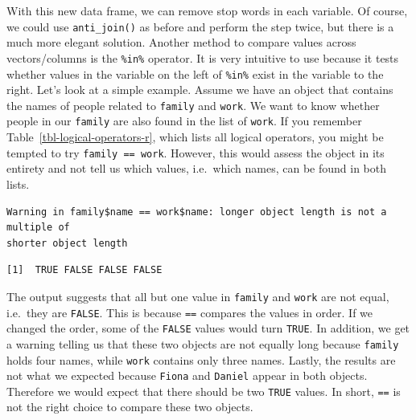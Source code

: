 \documentclass[
  letterpaper,
  DIV=11,
  numbers=noendperiod]{scrreprt}
\newenvironment{Shaded}{\begin{snugshade}}{\end{snugshade}}
\newcommand{\AttributeTok}[1]{\textcolor[rgb]{0.40,0.45,0.13}{#1}}
\newcommand{\CommentTok}[1]{\textcolor[rgb]{0.37,0.37,0.37}{#1}}
\newcommand{\FunctionTok}[1]{\textcolor[rgb]{0.28,0.35,0.67}{#1}}
\newcommand{\NormalTok}[1]{\textcolor[rgb]{0.00,0.23,0.31}{#1}}
\newcommand{\OtherTok}[1]{\textcolor[rgb]{0.00,0.23,0.31}{#1}}
\newcommand{\SpecialCharTok}[1]{\textcolor[rgb]{0.37,0.37,0.37}{#1}}
\newcommand{\StringTok}[1]{\textcolor[rgb]{0.13,0.47,0.30}{#1}}
\begin{document}
With this new data frame, we can remove stop words in each variable. Of
course, we could use \texttt{anti\_join()} as before and perform the
step twice, but there is a much more elegant solution. Another method to
compare values across vectors/columns is the \texttt{\%in\%} operator.
It is very intuitive to use because it tests whether values in the
variable on the left of \texttt{\%in\%} exist in the variable to the
right. Let's look at a simple example. Assume we have an object that
contains the names of people related to \texttt{family} and
\texttt{work}. We want to know whether people in our \texttt{family} are
also found in the list of \texttt{work}. If you remember
Table~\ref{tbl-logical-operators-r}, which lists all logical operators,
you might be tempted to try \texttt{family\ ==\ work}. However, this
would assess the object in its entirety and not tell us which values,
i.e.~which names, can be found in both lists.

\begin{Shaded}
\end{Shaded}

\begin{verbatim}
Warning in family$name == work$name: longer object length is not a multiple of
shorter object length
\end{verbatim}

\begin{verbatim}
[1]  TRUE FALSE FALSE FALSE
\end{verbatim}

The output suggests that all but one value in \texttt{family} and
\texttt{work} are not equal, i.e.~they are \texttt{FALSE}. This is
because \texttt{==} compares the values in order. If we changed the
order, some of the \texttt{FALSE} values would turn \texttt{TRUE}. In
addition, we get a warning telling us that these two objects are not
equally long because \texttt{family} holds four names, while
\texttt{work} contains only three names. Lastly, the results are not
what we expected because \texttt{Fiona} and \texttt{Daniel} appear in
both objects. Therefore we would expect that there should be two
\texttt{TRUE} values. In short, \texttt{==} is not the right choice to
compare these two objects.
\end{document}
